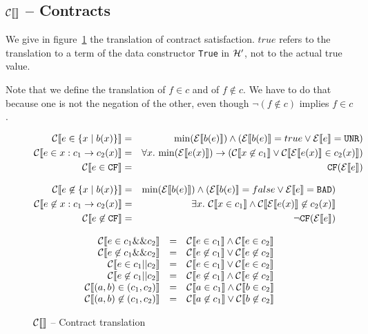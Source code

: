 \documentclass[preprint]{sigplanconf}
\begin{document}
\subsection{$\ctrans{}$ -- Contracts}
We give in figure~\ref{ctrans} the translation of contract satisfaction.
$true$ refers to the translation to a term of the data constructor
\texttt{True} in $\hprime$, not to the actual true value.

Note that we define the translation of $f \in c$ and of $f \not \in
c$. We have to do that because one is not the negation of the other,
even though $\lnot (f \not \in c)$ implies $f \in c$.

\begin{figure}
\begin{eqnarray*}
  \ctrans{e \in \{x \mid b(x) \}} &=&  \min{\etrans{b(e)}} \land (\etrans{b(e)} = true \lor \etrans{e} = \unr)\\
  \ctrans{e \in x:c_1 \to c_2(x)} &=& \forall x.~\min{\etrans{e(x)}} \to (\ctrans{x \not \in c_1} \lor  \ctrans{\etrans{e(x)} \in c_2(x)})\\
  \ctrans{e \in \cfc} &=& \cf{\etrans{e}}
\end{eqnarray*}

\begin{eqnarray*}
  \ctrans{e \not \in \{x \mid b(x) \}} &=&  \min{\etrans{b(e)}} \land (\etrans{b(e)} = false \lor \etrans{e} = \bad)\\
  \ctrans{e \not \in x:c_1 \to c_2(x)} &=& \exists x.~ \ctrans{x \in c_1} \land  \ctrans{\etrans{e(x)} \not \in c_2(x)}\\
  \ctrans{e \not \in \cfc} &=& \lnot \cf{\etrans{e}}
\end{eqnarray*}

\begin{center}
\[  \begin{array}{rcl}
 \ctrans{e \in c_1 \&\& c_2} &=& \ctrans{e \in c_1} \land \ctrans{e \in c_2} \\
 \ctrans{e \not \in c_1 \&\& c_2} &=& \ctrans{e \not \in c_1} \lor \ctrans{e \not \in c_2}\\
 \ctrans{e \in c_1 || c_2} &=& \ctrans{e \in c_1} \lor \ctrans{e \in c_2} \\
  \ctrans{e \not \in c_1 || c_2} &=& \ctrans{e \not \in c_1} \land \ctrans{e \not \in c_2}\\
 \ctrans{(a,b) \in (c_1,c_2)}   &=& \ctrans{a \in c_1} \land \ctrans{b \in c_2} \\
 \ctrans{(a,b) \not \in (c_1,c_2)}   &=& \ctrans{a \not \in c_1} \lor \ctrans{b \not \in c_2} \\
\end{array} \]
\end{center}

\caption{$\ctrans{}$ -- Contract translation}
\label{ctrans}
\end{figure}
\end{document}
